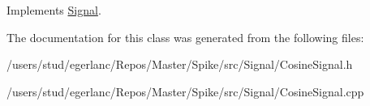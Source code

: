 Implements \hyperlink{classSignal_a32c22f17b70b215d78171716f844fa60}{Signal}.



The documentation for this class was generated from the following files\+:\begin{DoxyCompactItemize}
\item 
/users/stud/egerlanc/\+Repos/\+Master/\+Spike/src/\+Signal/Cosine\+Signal.\+h\item 
/users/stud/egerlanc/\+Repos/\+Master/\+Spike/src/\+Signal/Cosine\+Signal.\+cpp\end{DoxyCompactItemize}
